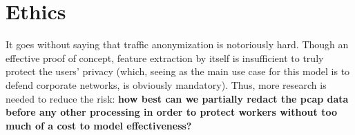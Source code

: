 \section{Ethics}

It goes without saying that traffic anonymization is notoriously hard. Though an effective proof of concept, feature extraction by itself is insufficient to truly protect the users' privacy (which, seeing as the main use case for this model is to defend corporate networks, is obviously mandatory). Thus, more research is needed to reduce the risk: \textbf{how best can we partially redact the pcap data before any other processing in order to protect workers without too much of a cost to model effectiveness?}

